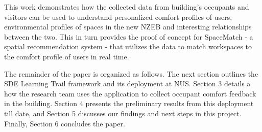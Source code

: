 This work demonstrates how the collected data from building's occupants and visitors can be used to understand personalized comfort profiles of users, environmental profiles of spaces in the new NZEB and interesting relationships between the two. This in turn provides the proof of concept for SpaceMatch - a spatial recommendation system - that utilizes the data to match workspaces to the comfort profile of users in real time.

The remainder of the paper is organized as follows. The next section outlines the SDE Learning Trail framework and its deployment at NUS. Section 3 details a how the research team uses the application to collect occupant comfort feedback in the building. Section 4 presents the preliminary results from this deployment till date, and Section 5 discusses our findings and next steps in this project. Finally, Section 6 concludes the paper. 







